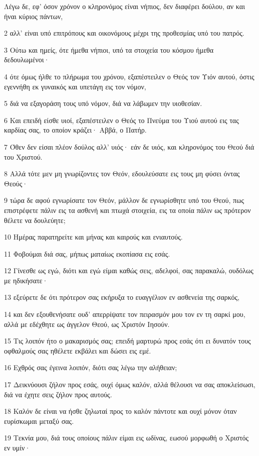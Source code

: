 \par Λέγω δε, εφ' όσον χρόνον ο κληρονόμος είναι νήπιος, δεν διαφέρει δούλου, αν και ήναι κύριος πάντων,
\par 2 αλλ' είναι υπό επιτρόπους και οικονόμους μέχρι της προθεσμίας υπό του πατρός.
\par 3 Ούτω και ημείς, ότε ήμεθα νήπιοι, υπό τα στοιχεία του κόσμου ήμεθα δεδουλωμένοι·
\par 4 ότε όμως ήλθε το πλήρωμα του χρόνου, εξαπέστειλεν ο Θεός τον Υιόν αυτού, όστις εγεννήθη εκ γυναικός και υπετάγη εις τον νόμον,
\par 5 διά να εξαγοράση τους υπό νόμον, διά να λάβωμεν την υιοθεσίαν.
\par 6 Και επειδή είσθε υιοί, εξαπέστειλεν ο Θεός το Πνεύμα του Υιού αυτού εις τας καρδίας σας, το οποίον κράζει· Αββά, ο Πατήρ.
\par 7 Όθεν δεν είσαι πλέον δούλος αλλ' υιός· εάν δε υιός, και κληρονόμος του Θεού διά του Χριστού.
\par 8 Αλλά τότε μεν μη γνωρίζοντες τον Θεόν, εδουλεύσατε εις τους μη φύσει όντας Θεούς·
\par 9 τώρα δε αφού εγνωρίσατε τον Θεόν, μάλλον δε εγνωρίσθητε υπό του Θεού, πως επιστρέφετε πάλιν εις τα ασθενή και πτωχά στοιχεία, εις τα οποία πάλιν ως πρότερον θέλετε να δουλεύητε;
\par 10 Ημέρας παρατηρείτε και μήνας και καιρούς και ενιαυτούς.
\par 11 Φοβούμαι διά σας, μήπως ματαίως εκοπίασα εις εσάς.
\par 12 Γίνεσθε ως εγώ, διότι και εγώ είμαι καθώς σεις, αδελφοί, σας παρακαλώ, ουδόλως με ηδικήσατε·
\par 13 εξεύρετε δε ότι πρότερον σας εκήρυξα το ευαγγέλιον εν ασθενεία της σαρκός,
\par 14 και δεν εξουθενήσατε ουδ' απερρίψατε τον πειρασμόν μου τον εν τη σαρκί μου, αλλά με εδέχθητε ως άγγελον Θεού, ως Χριστόν Ιησούν.
\par 15 Τις λοιπόν ήτο ο μακαρισμός σας; επειδή μαρτυρώ προς εσάς ότι ει δυνατόν τους οφθαλμούς σας ηθέλετε εκβάλει και δώσει εις εμέ.
\par 16 Εχθρός σας έγεινα λοιπόν, διότι σας λέγω την αλήθειαν;
\par 17 Δεικνύουσι ζήλον προς εσάς, ουχί όμως καλόν, αλλά θέλουσι να σας αποκλείσωσι, διά να έχητε σεις ζήλον προς αυτούς.
\par 18 Καλόν δε είναι να ήσθε ζηλωταί προς το καλόν πάντοτε και ουχί μόνον όταν ευρίσκωμαι μεταξύ σας.
\par 19 Τεκνία μου, διά τους οποίους πάλιν είμαι εις ωδίνας, εωσού μορφωθή ο Χριστός εν υμίν·
